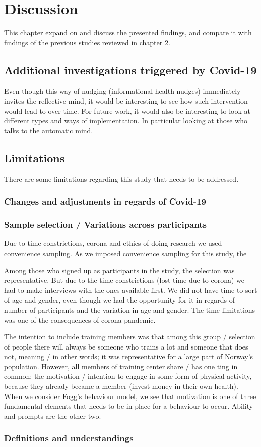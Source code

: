 \chapter{Discussion}
This chapter expand on and discuss the presented findings, and compare it with findings of the previous studies reviewed in chapter 2. 

\section{Additional investigations triggered by Covid-19}

Even though this way of nudging (informational health nudges) immediately invites the reflective mind, it would be interesting to see how such intervention would lead to over time.  For future work, it would also be interesting to look at different types and ways of implementation. In particular looking at those who talks to the automatic mind. 

\section{Limitations}
There are some limitations regarding this study that needs to be addressed.

\subsection{Changes and adjustments in regards of Covid-19 }

\subsection{Sample selection / Variations across participants}
Due to time constrictions, corona and ethics of doing research we used convenience sampling. As we imposed convenience sampling for this study, the 

Among those who signed up as participants in the study, the selection was representative. But due to the time constrictions (lost time due to corona) we had to make interviews with the ones available first. We did not have time to sort of age and gender, even though we had the opportunity for it in regards of number of participants and the variation in age and gender. The time limitations was one of the consequences of corona pandemic. 

The intention to include training members was that among this group / selection of people there will always be someone who trains a lot and someone that does not, meaning / in other words; it was representative for a large part of Norway's population. However, all members of training center share / has one ting in common; the motivation / intention to engage in some form of physical activity, because they already became a member (invest money in their own health). When we consider Fogg's behaviour model, we see that motivation is one of three fundamental elements that needs to be in place for a behaviour to occur. Ability and prompts are the other two. 

\subsection{Definitions and understandings}

